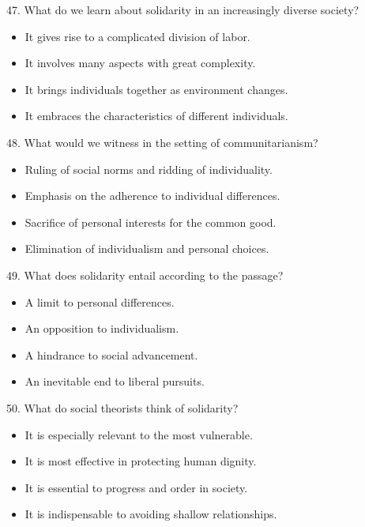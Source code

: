 \documentclass[UTF8,11pt]{ctexart}
\begin{document}
47. What do we learn about solidarity in an increasingly diverse society?


\begin{itemize}[leftmargin=2em,itemsep=.2em,topsep=.4em]\item[A.] It gives rise to a complicated division of labor.
\item[B.] It involves many aspects with great complexity.
\item[C.] It brings individuals together as environment changes.
\item[D.] It embraces the characteristics of different individuals.
\end{itemize}

48. What would we witness in the setting of communitarianism?


\begin{itemize}[leftmargin=2em,itemsep=.2em,topsep=.4em]\item[A.] Ruling of social norms and ridding of individuality.
\item[B.] Emphasis on the adherence to individual differences.
\item[C.] Sacrifice of personal interests for the common good.
\item[D.] Elimination of individualism and personal choices.
\end{itemize}

49. What does solidarity entail according to the passage?


\begin{itemize}[leftmargin=2em,itemsep=.2em,topsep=.4em]\item[A.] A limit to personal differences.
\item[B.] An opposition to individualism.
\item[C.] A hindrance to social advancement.
\item[D.] An inevitable end to liberal pursuits.
\end{itemize}

50. What do social theorists think of solidarity?


\begin{itemize}[leftmargin=2em,itemsep=.2em,topsep=.4em]\item[A.] It is especially relevant to the most vulnerable.
\item[B.] It is most effective in protecting human dignity.
\item[C.] It is essential to progress and order in society.
\item[D.] It is indispensable to avoiding shallow relationships.
\end{itemize}
\end{document}
